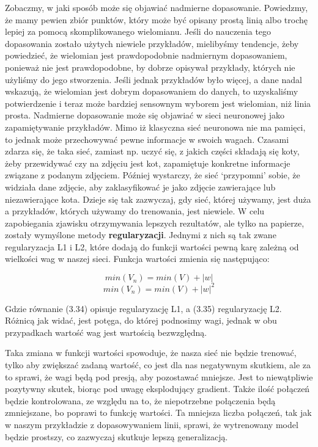 Zobaczmy, w jaki sposób może się objawiać nadmierne dopasowanie. Powiedzmy, że mamy pewien zbiór punktów, który może być opisany prostą linią albo trochę lepiej za pomocą skomplikowanego wielomianu. Jeśli do nauczenia tego dopasowania zostało użytych niewiele przykładów, mielibyśmy tendencje, żeby powiedzieć, że wielomian jest prawdopodobnie nadmiernym dopasowaniem, ponieważ nie jest prawdopodobne, by dobrze opisywał przykłady, których nie użyliśmy do jego stworzenia. Jeśli jednak przykładów było więcej, a dane nadal wskazują, że wielomian jest dobrym dopasowaniem do danych, to uzyskaliśmy potwierdzenie i teraz może bardziej sensownym wyborem jest wielomian, niż linia prosta. Nadmierne dopasowanie może się objawiać w sieci neuronowej jako zapamiętywanie przykładów. Mimo iż klasyczna sieć neuronowa nie ma pamięci, to jednak może przechowywać pewne informacje w swoich wagach. Czasami zdarza się, że taka sieć, zamiast np. uczyć się, z jakich części składają się koty, żeby przewidywać czy na zdjęciu jest kot, zapamiętuje konkretne informacje związane z podanym zdjęciem. Później wystarczy, że sieć ‘przypomni’ sobie, że widziała dane zdjęcie, aby zaklasyfikować je jako zdjęcie zawierające lub niezawierające kota. Dzieje się tak zazwyczaj, gdy sieć, której używamy, jest duża a przykładów, których używamy do trenowania, jest niewiele. W celu zapobiegania zjawisku otrzymywania lepszych rezultatów, ale tylko na papierze, zostały wymyślone metody \textbf{regularyzacji}. Jednymi z nich są tak zwane regularyzacja L1 i L2, które dodają do funkcji wartości pewną karę zależną od wielkości wag w naszej sieci. Funkcja wartości zmienia się następująco:

\begin{equation}
min(V_n) = min(V) + |w|
\end{equation}
\begin{equation}
min(V_n) = min(V) + |w|^2
\end{equation}

\noindent Gdzie równanie (3.34) opisuje regularyzację L1, a (3.35) regularyzację L2. Różnicą jak widać, jest potęga, do której podnosimy wagi, jednak w obu przypadkach wartość wag jest wartością bezwzględną.\newline

Taka zmiana w funkcji wartości spowoduje, że nasza sieć nie będzie trenować, tylko aby zwiększać zadaną wartość, co jest dla nas negatywnym skutkiem, ale za to sprawi, że wagi będą pod presją, aby pozostawać mniejsze. Jest to niewątpliwie pozytywny skutek, biorąc pod uwagę eksplodujący gradient. Także ilość połączeń będzie kontrolowana, ze względu na to, że niepotrzebne połączenia będą zmniejszane, bo poprawi to funkcję wartości. Ta mniejsza liczba połączeń, tak jak w naszym przykładzie z dopasowywaniem linii, sprawi, że wytrenowany model będzie prostszy, co zazwyczaj skutkuje lepszą generalizacją.\newline

